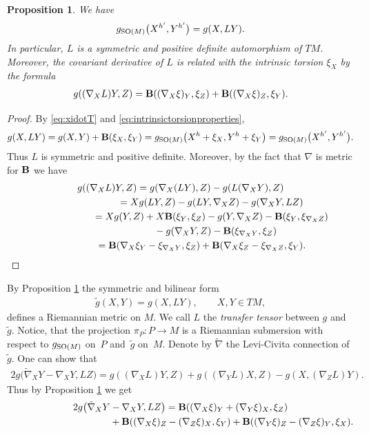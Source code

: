 \documentclass[10pt,a4paper]{amsart}
\numberwithin{equation}{section}
\newtheorem{Proposition}[Theorem]{Proposition}
\begin{document}
\begin{Proposition}\label{prop:PropertiesofL}
We have
\begin{gather*}
g_{{\rm SO}(M)}\big(X^{h'},Y^{h'}\big)=g(X,LY).
\end{gather*}
In particular, $L$ is a symmetric and positive definite automorphism of $TM$. Moreover, the covariant derivative of $L$ is related with the intrinsic torsion $\xi_X$ by the formula
\begin{gather*}
g((\nabla_XL)Y,Z)={\bf B}((\nabla_X\xi)_Y,\xi_Z)+{\bf B}((\nabla_X\xi)_Z,\xi_Y).
\end{gather*}
\end{Proposition}
\begin{proof}
By \eqref{eq:xidotT} and \eqref{eq:intrinsictorsionproperties},
\begin{gather*}
g(X,LY) =g(X,Y)+{\bf B}(\xi_X,\xi_Y)=g_{{\rm SO}(M)}\big(X^h+\xi_X,Y^h+\xi_Y\big) =g_{{\rm SO}(M)}\big(X^{h'},Y^{h'}\big).
\end{gather*}
Thus $L$ is symmetric and positive def\/inite. Moreover, by the fact that $\nabla$ is metric for ${\bf B}$ we have
\begin{gather*}
g((\nabla_XL)Y,Z)=g(\nabla_X(LY),Z)-g(L(\nabla_XY),Z)\\
\hphantom{g((\nabla_XL)Y,Z)}{} =Xg(LY,Z)-g(LY,\nabla_XZ)-g(\nabla_XY,LZ)\\
\hphantom{g((\nabla_XL)Y,Z)}{}=Xg(Y,Z)+X{\bf B}(\xi_Y,\xi_Z)-g(Y,\nabla_XZ)-{\bf B}(\xi_Y,\xi_{\nabla_XZ})\\
\hphantom{g((\nabla_XL)Y,Z)=}{}-g(\nabla_XY,Z)-{\bf B}(\xi_{\nabla_XY},\xi_Z)\\
\hphantom{g((\nabla_XL)Y,Z)}{}={\bf B}(\nabla_X\xi_Y-\xi_{\nabla_XY},\xi_Z) +{\bf B}(\nabla_X\xi_Z-\xi_{\nabla_XZ},\xi_Y).\tag*{\qed}
\end{gather*}\renewcommand{\qed}{}
\end{proof}

By Proposition \ref{prop:PropertiesofL} the symmetric and bilinear form
\begin{gather*}
\tilde{g}(X,Y)=g(X,LY),\qquad X,Y\in TM,
\end{gather*}
def\/ines a Riemannian metric on $M$. We call $L$ the {\it transfer tensor} between $g$ and~$\tilde g$. Notice, that the projection $\pi_P\colon P\to M$ is a Riemannian submersion with respect to $g_{{\rm SO}(M)}$ on~$P$ and~$\tilde{g}$ on~$M$. Denote by $\tilde{\nabla}$ the Levi-Civita connection of~$\tilde{g}$. One can show that \cite{gm}
\begin{gather*}%
2g\big(\tilde{\nabla}_XY-\nabla_XY,LZ\big)=g((\nabla_XL)Y,Z)+g((\nabla_YL)X,Z)-g(X,(\nabla_ZL)Y).
\end{gather*}
Thus by Proposition \ref{prop:PropertiesofL} we get
\begin{gather}
2g\big(\tilde{\nabla}_XY-\nabla_XY,LZ\big) ={\bf B}((\nabla_X\xi)_Y+(\nabla_Y\xi)_X,\xi_Z)\nonumber\\
\hphantom{2g\big(\tilde{\nabla}_XY-\nabla_XY,LZ\big) =}{} +{\bf B}((\nabla_X\xi)_Z-(\nabla_Z\xi)_X,\xi_Y)+{\bf B}((\nabla_Y\xi)_Z-(\nabla_Z\xi)_Y,\xi_X).\label{eq:differencetensor}
\end{gather}
\end{document}
